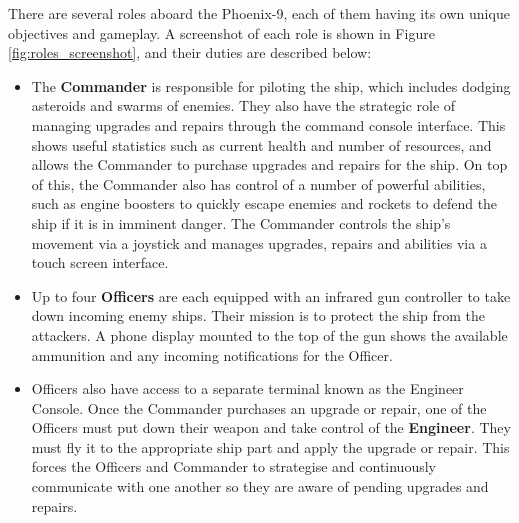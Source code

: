 \documentclass[a4paper,11pt]{article}
\begin{document}
There are several roles aboard the Phoenix-9, each of them having its own unique objectives and gameplay. A screenshot of each role is shown in Figure \ref{fig:roles_screenshot}, and their duties are described below:

\begin{itemize}[noitemsep,topsep=.5ex]
  \item The \textbf{Commander} is responsible for piloting the ship, which includes dodging asteroids and swarms of enemies. They also have the strategic role of managing upgrades and repairs through the command console interface. This shows useful statistics such as current health and number of resources, and allows the Commander to purchase upgrades and repairs for the ship. On top of this, the Commander also has control of a number of powerful abilities, such as engine boosters to quickly escape enemies and rockets to defend the ship if it is in imminent danger. 
  The Commander controls the ship's movement via a joystick and manages upgrades, repairs and abilities via a touch screen interface. 

  \item Up to four \textbf{Officers} are each equipped with an infrared gun controller to take down incoming enemy ships. Their mission is to protect the ship from the attackers. A phone display mounted to the top of the gun shows the available ammunition and any incoming notifications for the Officer.

  \item Officers also have access to a separate terminal known as the Engineer Console. Once the Commander purchases an upgrade or repair, one of the Officers must put down their weapon and take control of the \textbf{Engineer}. They must fly it to the appropriate ship part and apply the upgrade or repair. This forces the Officers and Commander to strategise and continuously communicate with one another so they are aware of pending upgrades and repairs.
\end{itemize}
\end{document}
